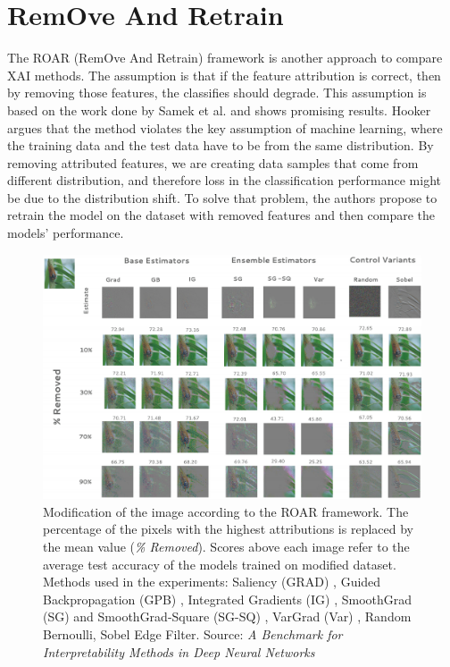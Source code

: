 \section{RemOve And Retrain}\label{section:roar}

The ROAR (RemOve And Retrain) framework \cite{hooker2018benchmark} is another approach to compare XAI methods. The assumption is that if the feature attribution is correct, then by removing those features, the classifies should degrade. This assumption is based on the work done by Samek et al.\cite{samek2016evaluating} and shows promising results. Hooker argues that the method violates the key assumption of machine learning, where the training data and the test data have to be from the same distribution. By removing attributed features, we are creating data samples that come from different distribution, and therefore loss in the classification performance might be due to the distribution shift. To solve that problem, the authors propose to retrain the model on the dataset with removed features and then compare the models' performance.

\begin{figure}[ht]
    \centering
    \includegraphics[width=\textwidth]{methods/images/roar-remove.png}
 \caption{Modification of the image according to the ROAR framework. The percentage of the pixels with the highest attributions is replaced by the mean value (\textit{\% Removed}). Scores above each image refer to the average test accuracy of the models trained on modified dataset. Methods used in the experiments: Saliency (GRAD) \cite{simonyan2014deep}, Guided Backpropagation (GPB) \cite{springenberg2014striving}, Integrated Gradients (IG) \cite{sundararajan2017axiomatic}, SmoothGrad (SG) and SmoothGrad-Square (SG-SQ) \cite{simonyan2014deep}, VarGrad (Var) \cite{selvaraju2017grad}, Random Bernoulli, Sobel Edge Filter. Source: \textit{A Benchmark for Interpretability Methods in Deep Neural Networks} \cite{hooker2018benchmark} }\label{fig:roar-remove}
\end{figure}

